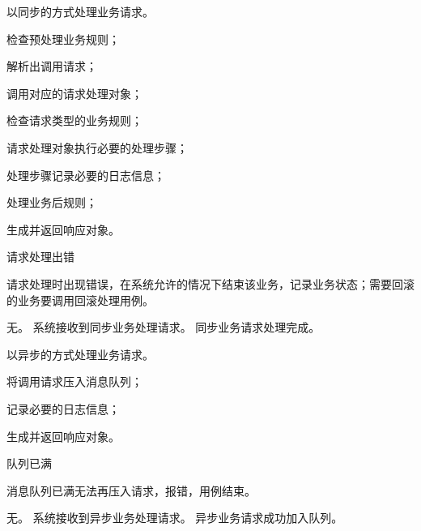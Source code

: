 \documentclass[cs4size,a4paper,nofonts]{ctexart}
\begin{document}
{以同步的方式处理业务请求。} %
{} %
{
\item 检查预处理业务规则；
\item 解析出调用请求；
\item 调用对应的请求处理对象；
\item 检查请求类型的业务规则；
\item 请求处理对象执行必要的处理步骤；
\item 处理步骤记录必要的日志信息；
\item 处理业务后规则；
\item 生成并返回响应对象。
} %
{} %
{
\item 请求处理出错\par
请求处理时出现错误，在系统允许的情况下结束该业务，记录业务状态；需要回滚的业务要调用回滚处理用例。
} %
{无。} %
{系统接收到同步业务处理请求。} %
{同步业务请求处理完成。} %

{以异步的方式处理业务请求。} %
{} %
{
\item 将调用请求压入消息队列；
\item 记录必要的日志信息；
\item 生成并返回响应对象。
} %
{} %
{
\item 队列已满\par
消息队列已满无法再压入请求，报错，用例结束。
} %
{无。} %
{系统接收到异步业务处理请求。} %
{异步业务请求成功加入队列。} %

\end{document}
